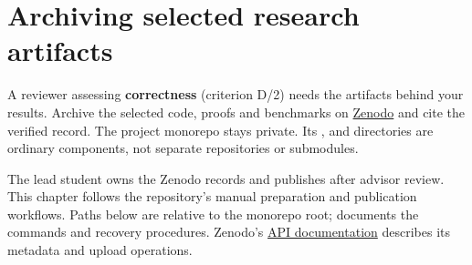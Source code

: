 \chapter{Archiving selected research artifacts}\label{guide:zenodo}
A reviewer assessing \textbf{correctness} (criterion D/2) needs the artifacts behind your results. Archive the selected code, proofs and benchmarks on \href{https://zenodo.org/}{Zenodo} and cite the verified record. The project monorepo stays private. Its ,  and  directories are ordinary components, not separate repositories or submodules.

The lead student owns the Zenodo records and publishes after advisor review. This chapter follows the repository's manual preparation and publication workflows. Paths below are relative to the monorepo root;  documents the commands and recovery procedures. Zenodo's \href{https://developers.zenodo.org/}{API documentation} describes its metadata and upload operations.

